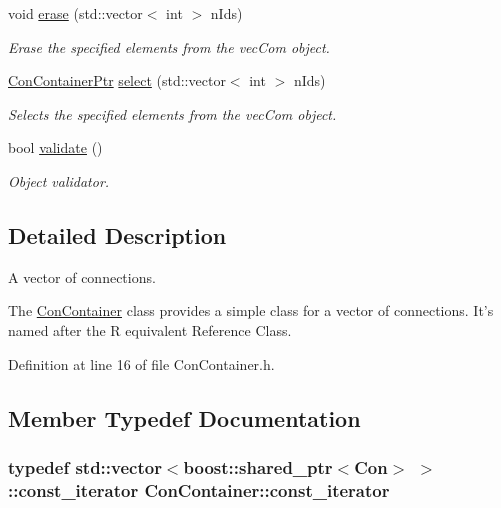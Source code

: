 \begin{DoxyCompactItemize}
void \hyperlink{class_con_container_a9665acde2f526ae4207b919c90615fe5}{erase} (std::vector$<$ int $>$ nIds)
\begin{DoxyCompactList}\small\item\em Erase the specified elements from the vecCom object. \end{DoxyCompactList}\item 
\hyperlink{_a_m_o_r_e_8h_a12fa6814670892b8e70b57d93c999323}{ConContainerPtr} \hyperlink{class_con_container_a7fb490683bd4733cae3c6428bad9328c}{select} (std::vector$<$ int $>$ nIds)
\begin{DoxyCompactList}\small\item\em Selects the specified elements from the vecCom object. \end{DoxyCompactList}\item 
bool \hyperlink{class_con_container_aac12a3d3604db9ff715503816109470c}{validate} ()
\begin{DoxyCompactList}\small\item\em Object validator. \end{DoxyCompactList}\end{DoxyCompactItemize}


\subsection{Detailed Description}
A vector of connections. 

The \hyperlink{class_con_container}{ConContainer} class provides a simple class for a vector of connections. It's named after the R equivalent Reference Class. 

Definition at line 16 of file ConContainer.h.



\subsection{Member Typedef Documentation}
\hypertarget{class_con_container_ac314ee4e351b3a5f595cd1de74fb3b5e}{
\subsubsection[{const\_\-iterator}]{\setlength{\rightskip}{0pt plus 5cm}typedef std::vector$<$boost::shared\_\-ptr$<${\bf Con}$>$ $>$::{\bf const\_\-iterator} {\bf ConContainer::const\_\-iterator}}}
\label{class_con_container_ac314ee4e351b3a5f595cd1de74fb3b5e}


